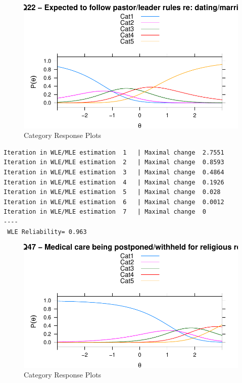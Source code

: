 \documentclass[
  letterpaper,
  DIV=11,
  numbers=noendperiod]{scrreport}
\begin{document}
\begin{figure}

{\centering \includegraphics{./results_files/figure-pdf/fig-RM-plot1-1.pdf}

}

\caption{\label{fig-RM-plot1}Category Response Plots}

\end{figure}

\begin{verbatim}
Iteration in WLE/MLE estimation  1   | Maximal change  2.7551 
Iteration in WLE/MLE estimation  2   | Maximal change  0.8593 
Iteration in WLE/MLE estimation  3   | Maximal change  0.4864 
Iteration in WLE/MLE estimation  4   | Maximal change  0.1926 
Iteration in WLE/MLE estimation  5   | Maximal change  0.028 
Iteration in WLE/MLE estimation  6   | Maximal change  0.0012 
Iteration in WLE/MLE estimation  7   | Maximal change  0 
----
 WLE Reliability= 0.963 
\end{verbatim}

\begin{figure}

{\centering \includegraphics{./results_files/figure-pdf/fig-RM-plot2-1.pdf}

}

\caption{\label{fig-RM-plot2}Category Response Plots}

\end{figure}
\end{document}
